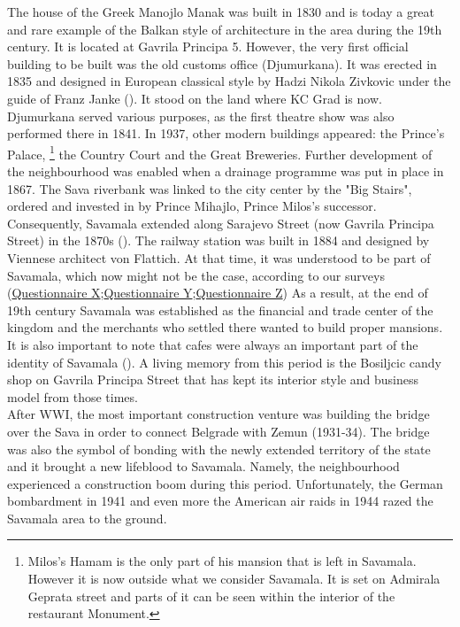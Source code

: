 \documentclass[11pt]{report}
\begin{document}
{{{{The house of the Greek Manojlo Manak was built in 1830 and is today a great and rare example of the Balkan style of architecture in the area during the 19th century. It is located at Gavrila Principa 5. However, the very first official building to be built was the old customs office (Djumurkana). It was erected in 1835 and designed in European classical style by Hadzi Nikola Zivkovic under the guide of Franz Janke (\href{Blagojevic}{\citealt{blagojevic_urban_2009}}). It stood on the land where KC Grad is now. Djumurkana served various purposes, as the first theatre show was also performed there in 1841. In 1937, other modern buildings appeared: the Prince's Palace,
\footnote{Milos’s Hamam is the only  part of his mansion that is left in Savamala. However it is now outside what we consider Savamala. It is set on Admirala Geprata street and parts of it can be seen within the interior
of the restaurant Monument.}
the Country Court and the Great Breweries. Further development  of  the  neighbourhood  was  enabled when a drainage programme  was  put  in place  in  1867.  The  Sava  riverbank  was  linked  to the city center by the "Big Stairs", ordered and invested in by Prince Mihajlo, Prince Milos’s successor. Consequently, Savamala  extended along Sarajevo Street (now Gavrila Principa Street) in the 1870s  (\href{Krusche}{\citealt{krusche_bureau_2015}}).
The railway station was built in 1884 and designed by Viennese architect von Flattich. At that time, it was understood to be part of Savamala, which now might not be the case, according to our surveys (\href{Questionnaire Experts Savamala}{Questionnaire X};\href{Questionnaire Experts Savamala}{Questionnaire Y};\href{Questionnaire Experts Savamala}{Questionnaire Z})
As a result, at the end of 19th century Savamala was established as the financial and trade center of the kingdom  and the merchants who settled there wanted to build proper mansions. It is also important to note that cafes were always an important part of the identity of Savamala  (\href{Nusic}{\citealt{nusic_kafane_2013}}). A living memory from this period is the Bosiljcic candy shop on Gavrila Principa Street that has kept its interior style and business model from those times.
\\
After WWI, the most important construction venture was building the bridge over the Sava in order to connect Belgrade with Zemun (1931-34). The bridge was also the symbol of bonding with the newly extended territory of the state and it brought a new lifeblood to Savamala. Namely, the neighbourhood experienced a construction boom during this period. Unfortunately, the German bombardment in 1941 and even more the American air raids in 1944 razed the Savamala area to the ground.
}}}}
\end{document}
